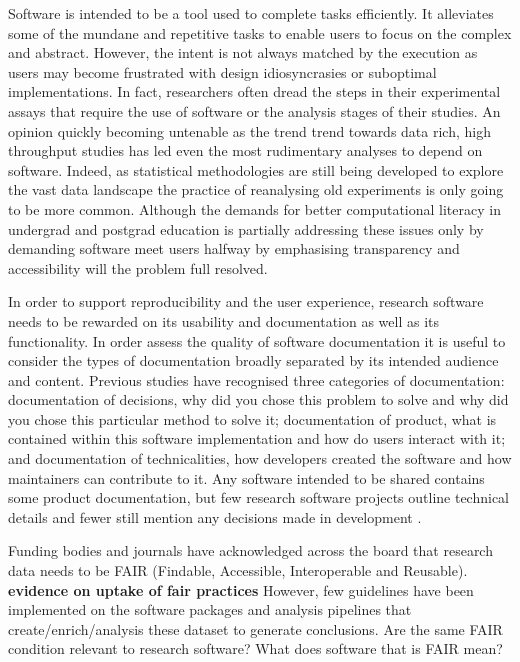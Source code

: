 \documentclass[../main.tex]{subfiles}
\begin{document}
Software is intended to be a tool used to complete tasks efficiently.
It alleviates some of the mundane and repetitive tasks to enable users to focus on the complex and abstract. 
However, the intent is not always matched by the execution as users may become frustrated with design idiosyncrasies or suboptimal implementations.
In fact, researchers often dread the steps in their experimental assays that require the use of software or the analysis stages of their studies.
An opinion quickly becoming untenable as the trend trend towards data rich, high throughput studies has led even the most rudimentary analyses to depend on software.
Indeed, as statistical methodologies are still being developed to explore the vast data landscape the practice of reanalysing old experiments is only going to be more common. 
Although the demands for better computational literacy in undergrad and postgrad education is partially addressing these issues only by demanding software meet users halfway by emphasising transparency and accessibility will the problem full resolved.

In order to support reproducibility and the user experience, research software needs to be rewarded on its usability and documentation as well as its functionality.
In order assess the quality of software documentation it is useful to consider the types of documentation broadly separated by its intended audience and content. 
Previous studies have recognised three categories of documentation: documentation of decisions, why did you chose this problem to solve and why did you chose this particular method to solve it; documentation of product, what is contained within this software implementation and how do users interact with it; and documentation of technicalities, how developers created the software and how maintainers can contribute to it. 
Any software intended to be shared contains some product documentation, but few research software projects outline technical details and fewer still mention any decisions made in development \cite{Geiger2018}.

Funding bodies and journals have acknowledged across the board that research data needs to be FAIR (Findable, Accessible, Interoperable and Reusable). \textbf{evidence on uptake of fair practices} However, few guidelines have been implemented on the software packages and analysis pipelines that create/enrich/analysis these dataset to generate conclusions. Are the same FAIR condition relevant to research software? What does software that is FAIR mean? %
\end{document}
